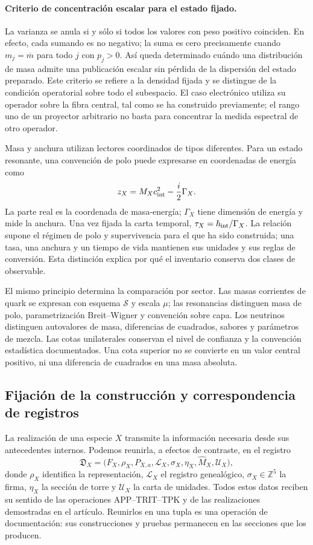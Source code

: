 \paragraph{Criterio de concentración escalar para el estado fijado.}
La varianza se anula si y sólo si todos los valores con peso positivo
coinciden. En efecto, cada sumando es no negativo; la suma es cero
precisamente cuando \(m_j=\overline m\) para todo \(j\) con
\(p_j>0\). Así queda determinado cuándo una distribución de masa admite
una publicación escalar sin pérdida de la dispersión del estado preparado.
Este criterio se refiere a la densidad fijada y se distingue de la condición
operatorial sobre todo el subespacio. El caso electrónico utiliza su
operador sobre la fibra central, tal como se ha construido previamente;
el rango uno de un proyector arbitrario no basta para concentrar la medida
espectral de otro operador.

Masa y anchura utilizan lectores coordinados de tipos diferentes. Para un
estado resonante, una convención de polo puede expresarse en coordenadas de
energía como
\[
 z_X=M_Xc_{\rm int}^{2}-\frac{i}{2}\Gamma_X.
\]
La parte real es la coordenada de masa-energía; \(\Gamma_X\) tiene
dimensión de energía y mide la anchura. Una vez fijada la carta temporal,
\(\tau_X=\hbar_{\rm int}/\Gamma_X\). La relación supone el régimen de
polo y supervivencia para el que ha sido construida; una tasa, una anchura y
un tiempo de vida mantienen sus unidades y sus reglas de conversión. Esta
distinción explica por qué el inventario conserva dos clases de observable.

El mismo principio determina la comparación por sector. Las masas corrientes
de quark se expresan con esquema \(\mathscr S\) y escala \(\mu\);
las resonancias distinguen masa de polo, parametrización Breit--Wigner y
convención sobre capa. Los neutrinos distinguen autovalores de masa,
diferencias de cuadrados, sabores y parámetros de mezcla. Las cotas
unilaterales conservan el nivel de confianza y la convención estadística
documentados. Una cota superior no se convierte en un valor central positivo,
ni una diferencia de cuadrados en una masa absoluta.

\subsection{Fijación de la construcción y correspondencia de registros}
\label{vi:subsec:vi-congelacion}

La realización de una especie \(X\) transmite la información necesaria
desde sus antecedentes internos. Podemos reunirla, a efectos de contraste,
en el registro
\[
 \mathfrak D_X=
 \bigl(F_X,\rho_X,P_{X,a},\mathcal L_X,
       \sigma_X,\eta_X,\widehat M_X,\mathcal U_X\bigr),
\]
donde \(\rho_X\) identifica la representación, \(\mathcal L_X\) el
registro genealógico, \(\sigma_X\in\mathbb Z^5\) la firma,
\(\eta_X\) la sección de torre y \(\mathcal U_X\) la carta de
unidades. Todos estos datos reciben su sentido de las operaciones
APP--TRIT--TPK y de las realizaciones demostradas en el artículo. Reunirlos
en una tupla es una operación de documentación: sus construcciones y
pruebas permanecen en las secciones que los producen.

